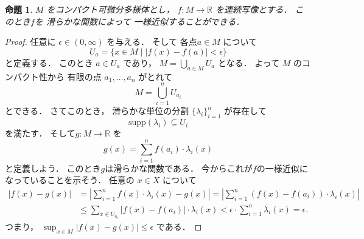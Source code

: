 \documentclass[leqno, a4paper, 12pt, dvipdfmx]{jsarticle}
\newtheorem{prop}[thm]{命題}
\newcommand{\rr}{\mathbb{R}}
\newcommand{\supp}{\mathrm{supp}}
\begin{document}
\begin{prop}\label{prop:pou}
$M$
をコンパクト可微分多様体とし，
$f\colon M\to \rr$
を連続写像とする．
このとき$f$を
滑らかな関数によって
一様近似することができる．
\end{prop}
\begin{proof}
任意に
$\epsilon\in (0, \infty)$
を与える．
そして
各点$a\in M$
について
\[
U_{a}=\{x\in M\mid |f(x)-f(a)|<\epsilon\}
\]
と定義する．
このとき
$a\in U_{a}$
であり，
$M=\bigcup_{a\in M}U_{a}$
となる．
よって
$M$
のコンパクト性から
有限の点
$a_{1}, \dots, a_{n}$
がとれて
\[
M=\bigcup_{i=1}^{n}U_{a_{i}}
\]
とできる．
さてこのとき，
滑らかな単位の分割
$\{\lambda_{i}\}_{i=1}^{n}$
が存在して
\[
\supp(\lambda_{i})\subseteq U_{i}
\]
を満たす．
そして$g\colon M\to \rr$
を
\[
g(x)=\sum_{i=1}^{n}f(a_{i})\cdot \lambda_{i}(x)
\]
と定義しよう．
このとき$g$は滑らかな関数である．
今からこれが$f$の一様近似になっていることを示そう．
任意の
$x\in X$
について
\begin{align*}
|f(x)-g(x)|&=
\left|\sum_{i=1}^{n}f(x)\cdot \lambda_{i}(x)-g(x)\right|
=\left|\sum_{i=1}^{n}(f(x)-f(a_{i}))\cdot \lambda_{i}(x)\right|\\
&
\le \sum_{x\in U_{a_{i}}}|f(x)-f(a_{i})|\cdot \lambda_{i}(x)
<\epsilon \cdot \sum_{i=1}^{n}\lambda_{i}(x)
=\epsilon. 
\end{align*}
つまり，
$\sup_{x\in M}|f(x)-g(x)|\le \epsilon$
である．
\end{proof}
\end{document}

